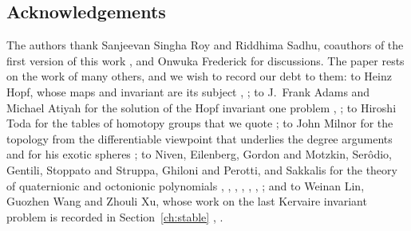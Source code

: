 \documentclass[11pt]{amsart}
\numberwithin{equation}{section}
\theoremstyle{plain}
\theoremstyle{definition}
\theoremstyle{remark}
\begin{document}
\subsection*{Acknowledgements}
The authors thank Sanjeevan Singha Roy and Riddhima Sadhu, coauthors of the first version of this work \cite{BSS22}, and Onwuka Frederick for discussions. The paper rests on the work of many others, and we wish to record our debt to them: to Heinz Hopf, whose maps and invariant are its subject \cite{Hop31}, \cite{Hop35}; to J.~Frank Adams and Michael Atiyah for the solution of the Hopf invariant one problem \cite{Ada60}, \cite{AA66}; to Hiroshi Toda for the tables of homotopy groups that we quote \cite{Tod62}; to John Milnor for the topology from the differentiable viewpoint that underlies the degree arguments \cite{Mil65} and for his exotic spheres \cite{Mil56}; to Niven, Eilenberg, Gordon and Motzkin, Ser\^odio, Gentili, Stoppato and Struppa, Ghiloni and Perotti, and Sakkalis for the theory of quaternionic and octonionic polynomials \cite{Niv41}, \cite{EN44}, \cite{GM65}, \cite{Ser07}, \cite{GSS13}, \cite{GP11}, \cite{Sak20}; and to Weinan Lin, Guozhen Wang and Zhouli Xu, whose work on the last Kervaire invariant problem is recorded in Section~\ref{ch:stable} \cite{LWX24}, \cite{LWX24b}.
\begingroup\raggedright
\end{document}
